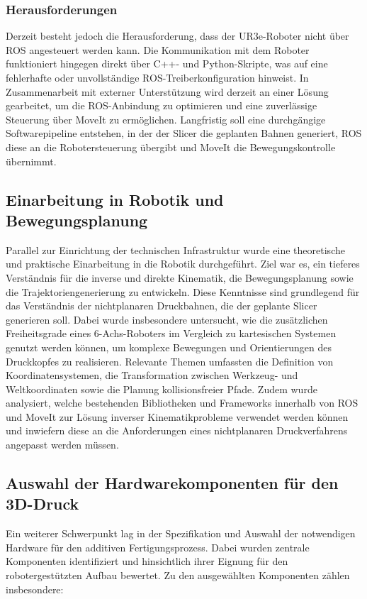 \documentclass[
	paper=a4,
	fontsize=11pt,
	parskip=half,
	headings=normal,
	bibliography=totoc,
	listof=totoc
]{scrartcl}
\begin{document}
\subsubsection{Herausforderungen}
	Derzeit besteht jedoch die Herausforderung, dass der UR3e-Roboter nicht über ROS angesteuert werden kann.
	Die Kommunikation mit dem Roboter funktioniert hingegen direkt über C++- und Python-Skripte, was auf eine fehlerhafte oder unvollständige ROS-Treiberkonfiguration hinweist.
	In Zusammenarbeit mit externer Unterstützung wird derzeit an einer Lösung gearbeitet, um die ROS-Anbindung zu optimieren und eine zuverlässige Steuerung über MoveIt zu ermöglichen.
	Langfristig soll eine durchgängige Softwarepipeline entstehen, in der der Slicer die geplanten Bahnen generiert, ROS diese an die Robotersteuerung übergibt und MoveIt die Bewegungskontrolle übernimmt.

\subsection{Einarbeitung in Robotik und Bewegungsplanung}
	Parallel zur Einrichtung der technischen Infrastruktur wurde eine theoretische und praktische Einarbeitung in die Robotik durchgeführt.
	Ziel war es, ein tieferes Verständnis für die inverse und direkte Kinematik, die Bewegungsplanung sowie die Trajektoriengenerierung zu entwickeln.
	Diese Kenntnisse sind grundlegend für das Verständnis der nichtplanaren Druckbahnen, die der geplante Slicer generieren soll.
	Dabei wurde insbesondere untersucht, wie die zusätzlichen Freiheitsgrade eines 6-Achs-Roboters im Vergleich zu kartesischen Systemen genutzt werden können, um komplexe Bewegungen und Orientierungen des Druckkopfes zu realisieren.
	Relevante Themen umfassten die Definition von Koordinatensystemen, die Transformation zwischen Werkzeug- und Weltkoordinaten sowie die Planung kollisionsfreier Pfade.
	Zudem wurde analysiert, welche bestehenden Bibliotheken und Frameworks innerhalb von ROS und MoveIt zur Lösung inverser Kinematikprobleme verwendet werden können und inwiefern diese an die Anforderungen eines nichtplanaren Druckverfahrens angepasst werden müssen.

\subsection{Auswahl der Hardwarekomponenten für den 3D-Druck}
	Ein weiterer Schwerpunkt lag in der Spezifikation und Auswahl der notwendigen Hardware für den additiven Fertigungsprozess.
	Dabei wurden zentrale Komponenten identifiziert und hinsichtlich ihrer Eignung für den robotergestützten Aufbau bewertet.
	Zu den ausgewählten Komponenten zählen insbesondere:
\end{document}
